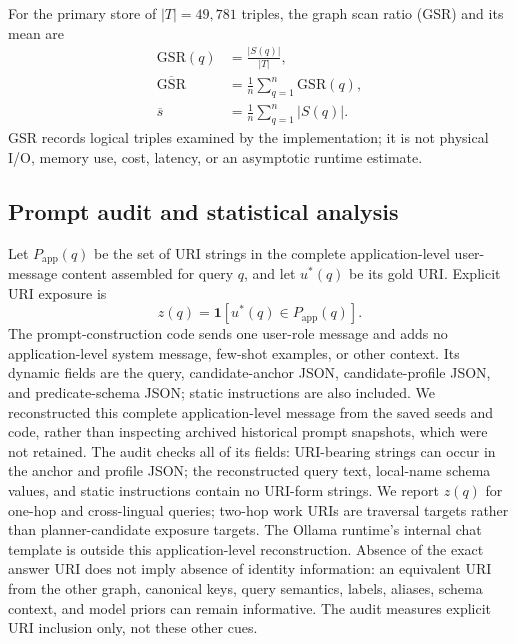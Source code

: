 \documentclass[a4paper,fleqn]{cas-dc}
\begin{document}
For the primary store of $|T|=49{,}781$ triples, the graph scan ratio (GSR) and its mean are
\begin{equation}
\begin{aligned}
\mathrm{GSR}(q)&=\frac{|S(q)|}{|T|},\\
\overline{\mathrm{GSR}}&=\frac{1}{n}\sum_{q=1}^{n}\mathrm{GSR}(q),\\
\overline{s}&=\frac{1}{n}\sum_{q=1}^{n}|S(q)|.
\end{aligned}
\label{eq:gsr}
\end{equation}
GSR records logical triples examined by the implementation; it is not physical I/O, memory use, cost, latency, or an asymptotic runtime estimate.

\subsection{Prompt audit and statistical analysis}
Let $P_{\mathrm{app}}(q)$ be the set of URI strings in the complete application-level user-message content assembled for query $q$, and let $u^{*}(q)$ be its gold URI. Explicit URI exposure is
\begin{equation}
z(q)=\mathbf{1}[u^{*}(q)\in P_{\mathrm{app}}(q)].
\label{eq:exposure}
\end{equation}
The prompt-construction code sends one user-role message and adds no application-level system message, few-shot examples, or other context. Its dynamic fields are the query, candidate-anchor JSON, candidate-profile JSON, and predicate-schema JSON; static instructions are also included. We reconstructed this complete application-level message from the saved seeds and code, rather than inspecting archived historical prompt snapshots, which were not retained. The audit checks all of its fields: URI-bearing strings can occur in the anchor and profile JSON; the reconstructed query text, local-name schema values, and static instructions contain no URI-form strings. We report $z(q)$ for one-hop and cross-lingual queries; two-hop work URIs are traversal targets rather than planner-candidate exposure targets. The Ollama runtime's internal chat template is outside this application-level reconstruction. Absence of the exact answer URI does not imply absence of identity information: an equivalent URI from the other graph, canonical keys, query semantics, labels, aliases, schema context, and model priors can remain informative. The audit measures explicit URI inclusion only, not these other cues.
\end{document}
